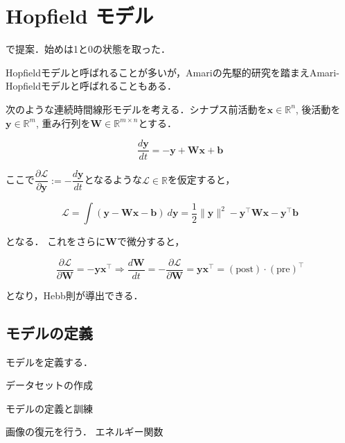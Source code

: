 \section{Hopfield モデル}


\cite{Hopfield1982-vu}で提案．始めは1と0の状態を取った．

Hopfieldモデルと呼ばれることが多いが，Amariの先駆的研究\cite{Amari1972-fq}を踏まえAmari-Hopfieldモデルと呼ばれることもある．

次のような連続時間線形モデルを考える．シナプス前活動を$\mathbf{x}\in \mathbb{R}^n$, 後活動を$\mathbf{y}\in \mathbb{R}^m$, 重み行列を$\mathbf{W}\in \mathbb{R}^{m\times n}$とする．


\begin{equation}
\frac{d\mathbf{y}}{dt}=-\mathbf{y}+\mathbf{W}\mathbf{x}+\mathbf{b}
\end{equation}


ここで$\dfrac{\partial\mathcal{L}}{\partial\mathbf{y}}:=-\dfrac{d\mathbf{y}}{dt}$となるような$\mathcal{L}\in \mathbb{R}$を仮定すると，


\begin{equation}
\mathcal{L}=\int \left(\mathbf{y}-\mathbf{W}\mathbf{x}-\mathbf{b}\right)\ d\mathbf{y}=\frac{1}{2}\|\mathbf{y}\|^2-\mathbf{y}^\top \mathbf{W}\mathbf{x}-\mathbf{y}^\top \mathbf{b}
\end{equation}


となる． これをさらに$\mathbf{W}$で微分すると，


\begin{equation}
\dfrac{\partial\mathcal{L}}{\partial\mathbf{W}}=-\mathbf{y}\mathbf{x}^\top\Rightarrow
\frac{d\mathbf{W}}{dt}=-\dfrac{\partial\mathcal{L}}{\partial\mathbf{W}}=\mathbf{y}\mathbf{x}^\top=(\text{post})\cdot (\text{pre})^\top
\end{equation}


となり，Hebb則が導出できる．
\subsection{モデルの定義}
モデルを定義する．



データセットの作成



モデルの定義と訓練



画像の復元を行う．
エネルギー関数


